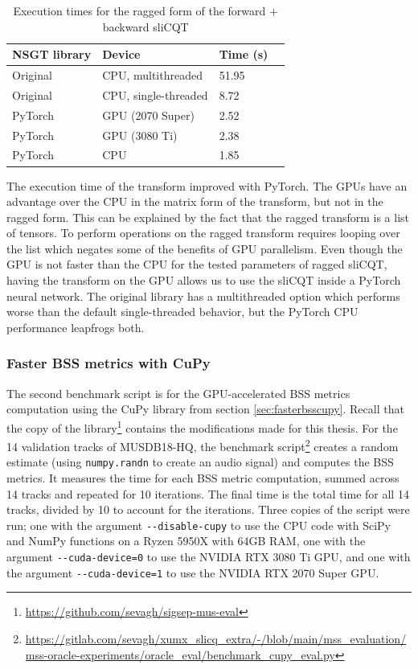 \documentclass[report.tex]{subfiles}
\begin{document}
\begin{table}[ht]
	\centering
	\caption{Execution times for the ragged form of the forward + backward sliCQT}
	\label{table:nsgttorchresultsragged}
	\begin{tabular}{ |l|l|l|l| }
	 \hline
		NSGT library & Device & Time (s) \\
	 \hline
	 \hline
		Original & CPU, multithreaded & 51.95  \\
	 \hline
		Original & CPU, single-threaded & 8.72  \\
	 \hline
		PyTorch & GPU (2070 Super) & 2.52 \\
	 \hline
		PyTorch & GPU (3080 Ti) &  2.38 \\
	 \hline
		PyTorch & CPU & 1.85  \\
	 \hline
\end{tabular}
\end{table}

The execution time of the transform improved with PyTorch. The GPUs have an advantage over the CPU in the matrix form of the transform, but not in the ragged form. This can be explained by the fact that the ragged transform is a list of tensors. To perform operations on the ragged transform requires looping over the list which negates some of the benefits of GPU parallelism. Even though the GPU is not faster than the CPU for the tested parameters of ragged sliCQT, having the transform on the GPU allows us to use the sliCQT inside a PyTorch neural network. The original library has a multithreaded option which performs worse than the default single-threaded behavior, but the PyTorch CPU performance leapfrogs both.

\subsubsection{Faster BSS metrics with CuPy}

The second benchmark script is for the GPU-accelerated BSS metrics computation using the CuPy library from section \ref{sec:fasterbsscupy}. Recall that the copy of the library\footnote{\url{https://github.com/sevagh/sigsep-mus-eval}} contains the modifications made for this thesis. For the 14 validation tracks of MUSDB18-HQ, the benchmark script\footnote{\url{https://gitlab.com/sevagh/xumx_slicq_extra/-/blob/main/mss_evaluation/mss-oracle-experiments/oracle_eval/benchmark_cupy_eval.py}}  creates a random estimate (using \Verb#numpy.randn# to create an audio signal) and computes the BSS metrics. It measures the time for each BSS metric computation, summed across 14 tracks and repeated for 10 iterations. The final time is the total time for all 14 tracks, divided by 10 to account for the iterations. Three copies of the script were run; one with the argument \Verb#--disable-cupy# to use the CPU code with SciPy and NumPy functions on a Ryzen 5950X with 64GB RAM, one with the argument \Verb#--cuda-device=0# to use the NVIDIA RTX 3080 Ti GPU, and one with the argument \Verb#--cuda-device=1# to use the NVIDIA RTX 2070 Super GPU.
\end{document}
